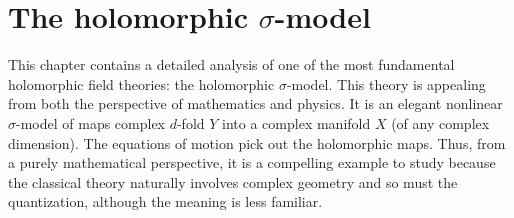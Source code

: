 %
%
%
%
%
%
%
%
%

\chapter{The holomorphic $\sigma$-model}\label{chap: holsig}

This chapter contains a detailed analysis of one of the most fundamental holomorphic field theories: the holomorphic $\sigma$-model.
This theory is appealing from both the perspective of mathematics and physics.
It is an elegant nonlinear $\sigma$-model of maps complex $d$-fold $Y$ into a complex manifold $X$ (of any complex dimension). The equations of motion pick out the holomorphic maps. 
Thus, from a purely mathematical perspective, it is a compelling example to study 
because the classical theory naturally involves complex geometry and so must the quantization, although the meaning is less familiar. 

